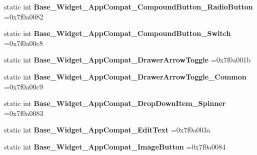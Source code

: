 \begin{DoxyCompactItemize}
static int {\bfseries Base\+\_\+\+Widget\+\_\+\+App\+Compat\+\_\+\+Compound\+Button\+\_\+\+Radio\+Button} =0x7f0a0082
\item 
\mbox{\label{classandroid_1_1support_1_1graphics_1_1drawable_1_1R_1_1style_a92c41e8c67f3f923ffb22e47b54cc1fd}} 
static int {\bfseries Base\+\_\+\+Widget\+\_\+\+App\+Compat\+\_\+\+Compound\+Button\+\_\+\+Switch} =0x7f0a00c8
\item 
\mbox{\label{classandroid_1_1support_1_1graphics_1_1drawable_1_1R_1_1style_afe517b2ce43ab85a053a285299858e2e}} 
static int {\bfseries Base\+\_\+\+Widget\+\_\+\+App\+Compat\+\_\+\+Drawer\+Arrow\+Toggle} =0x7f0a001b
\item 
\mbox{\label{classandroid_1_1support_1_1graphics_1_1drawable_1_1R_1_1style_ac618f270338d1f21678c09be480e1bf6}} 
static int {\bfseries Base\+\_\+\+Widget\+\_\+\+App\+Compat\+\_\+\+Drawer\+Arrow\+Toggle\+\_\+\+Common} =0x7f0a00c9
\item 
\mbox{\label{classandroid_1_1support_1_1graphics_1_1drawable_1_1R_1_1style_aa3b3a7e0d6c8dd781a0de4e5b8c55c46}} 
static int {\bfseries Base\+\_\+\+Widget\+\_\+\+App\+Compat\+\_\+\+Drop\+Down\+Item\+\_\+\+Spinner} =0x7f0a0083
\item 
\mbox{\label{classandroid_1_1support_1_1graphics_1_1drawable_1_1R_1_1style_ac0391dc9af8a2b66089e201e58af36a5}} 
static int {\bfseries Base\+\_\+\+Widget\+\_\+\+App\+Compat\+\_\+\+Edit\+Text} =0x7f0a003a
\item 
\mbox{\label{classandroid_1_1support_1_1graphics_1_1drawable_1_1R_1_1style_a681b3c868efbb65d042cfcc253758c20}} 
static int {\bfseries Base\+\_\+\+Widget\+\_\+\+App\+Compat\+\_\+\+Image\+Button} =0x7f0a0084
\item 
\mbox{\label{classandroid_1_1support_1_1graphics_1_1drawable_1_1R_1_1style_a7ceb2a9b760e35825a7276015cff5917}} 

\end{DoxyCompactItemize}
